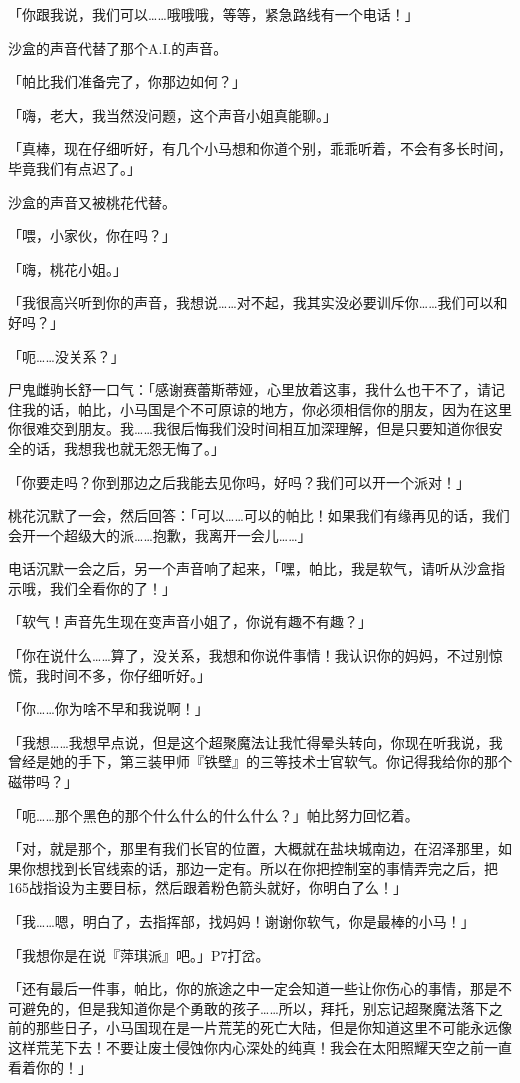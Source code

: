 「你跟我说，我们可以……哦哦哦，等等，紧急路线有一个电话！」

沙盒的声音代替了那个A.I.的声音。

「帕比我们准备完了，你那边如何？」

「嗨，老大，我当然没问题，这个声音小姐真能聊。」

「真棒，现在仔细听好，有几个小马想和你道个别，乖乖听着，不会有多长时间，毕竟我们有点迟了。」

沙盒的声音又被桃花代替。

「喂，小家伙，你在吗？」

「嗨，桃花小姐。」

「我很高兴听到你的声音，我想说……对不起，我其实没必要训斥你……我们可以和好吗？」

「呃……没关系？」

尸鬼雌驹长舒一口气：「感谢赛蕾斯蒂娅，心里放着这事，我什么也干不了，请记住我的话，帕比，小马国是个不可原谅的地方，你必须相信你的朋友，因为在这里你很难交到朋友。我……我很后悔我们没时间相互加深理解，但是只要知道你很安全的话，我想我也就无怨无悔了。」

「你要走吗？你到那边之后我能去见你吗，好吗？我们可以开一个派对！」

桃花沉默了一会，然后回答：「可以……可以的帕比！如果我们有缘再见的话，我们会开一个超级大的派……抱歉，我离开一会儿……」

电话沉默一会之后，另一个声音响了起来，「嘿，帕比，我是软气，请听从沙盒指示哦，我们全看你的了！」

「软气！声音先生现在变声音小姐了，你说有趣不有趣？」

「你在说什么……算了，没关系，我想和你说件事情！我认识你的妈妈，不过别惊慌，我时间不多，你仔细听好。」

「你……你为啥不早和我说啊！」

「我想……我想早点说，但是这个超聚魔法让我忙得晕头转向，你现在听我说，我曾经是她的手下，第三装甲师『铁壁』的三等技术士官软气。你记得我给你的那个磁带吗？」

「呃……那个黑色的那个什么什么的什么什么？」帕比努力回忆着。

「对，就是那个，那里有我们长官的位置，大概就在盐块城南边，在沼泽那里，如果你想找到长官线索的话，那边一定有。所以在你把控制室的事情弄完之后，把165战指设为主要目标，然后跟着粉色箭头就好，你明白了么！」

「我……嗯，明白了，去指挥部，找妈妈！谢谢你软气，你是最棒的小马！」

「我想你是在说『萍琪派』吧。」P7打岔。

「还有最后一件事，帕比，你的旅途之中一定会知道一些让你伤心的事情，那是不可避免的，但是我知道你是个勇敢的孩子……所以，拜托，别忘记超聚魔法落下之前的那些日子，小马国现在是一片荒芜的死亡大陆，但是你知道这里不可能永远像这样荒芜下去！不要让废土侵蚀你内心深处的纯真！我会在太阳照耀天空之前一直看着你的！」

